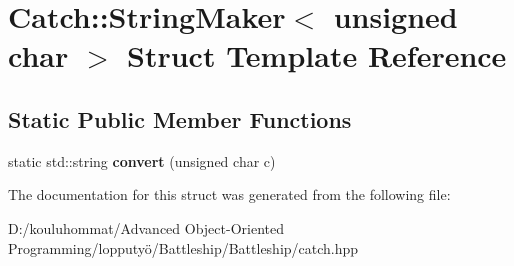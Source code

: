 \hypertarget{struct_catch_1_1_string_maker_3_01unsigned_01char_01_4}{}\section{Catch\+:\+:String\+Maker$<$ unsigned char $>$ Struct Template Reference}
\label{struct_catch_1_1_string_maker_3_01unsigned_01char_01_4}
\subsection*{Static Public Member Functions}
\begin{DoxyCompactItemize}
\item 
\mbox{\label{struct_catch_1_1_string_maker_3_01unsigned_01char_01_4_a7cddb1df26275b9a8e631466eb122f59}} 
static std\+::string {\bfseries convert} (unsigned char c)
\end{DoxyCompactItemize}


The documentation for this struct was generated from the following file\+:\begin{DoxyCompactItemize}
\item 
D\+:/kouluhommat/\+Advanced Object-\/\+Oriented Programming/lopputyö/\+Battleship/\+Battleship/catch.\+hpp\end{DoxyCompactItemize}
